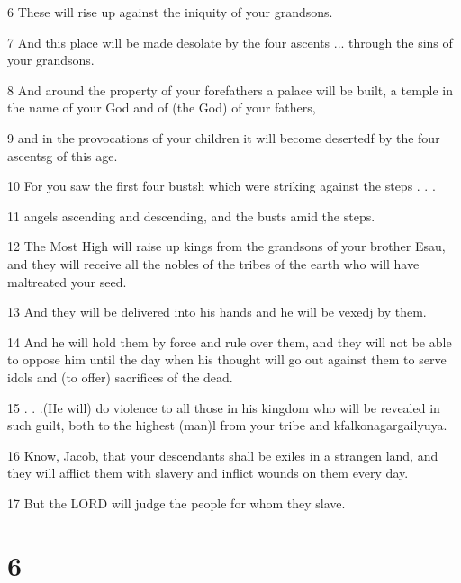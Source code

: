 \par 6 These will rise up against the iniquity of your grandsons. 

\par 7 And this place will be made desolate by the four ascents ... through the sins of your grandsons.

\par 8 And around the property of your forefathers a palace will be built, a temple in the name of your God and of (the God) of your fathers, 

\par 9 and in the provocations of your children it will become desertedf by the four ascentsg of this age. 

\par 10 For you saw the first four bustsh which were striking against the steps . . .

\par 11 angels ascending and descending, and the busts amid the steps. 

\par 12 The Most High will raise up kings from the grandsons of your brother Esau, and they will receive all the nobles of the tribes of the earth who will have maltreated your seed. 

\par 13 And they will be delivered into his hands and he will be vexedj by them. 

\par 14 And he will hold them by force and rule over them, and they will not be able to oppose him until the day when his thought will go out against them to serve idols and (to offer) sacrifices of the dead. 

\par 15 . . .(He will) do violence to all those in his kingdom who will be revealed in such guilt, both to the highest (man)l from your tribe and kfalkonagargailyuya. 

\par 16 Know, Jacob, that your descendants shall be exiles in a strangen land, and they will afflict them with slavery and inflict wounds on them every day. 

\par 17 But the LORD will judge the people for whom they slave.

\chapter{6}

